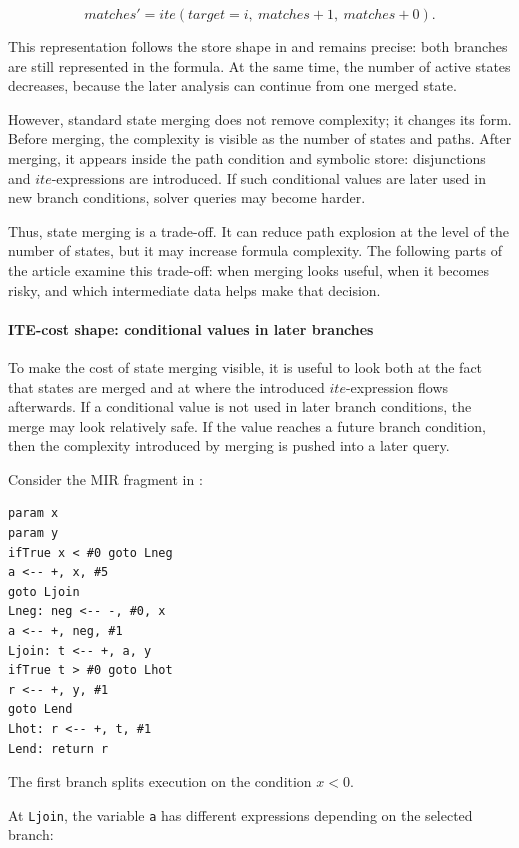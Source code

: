 \documentclass[conference]{IEEEtran}
\newcommand{\ite}{\mathit{ite}}
\begin{document}
\[
\mathit{matches}' =
\ite(\mathit{target} = i,\ \mathit{matches} + 1,\ \mathit{matches} + 0).
\]

This representation follows the store shape in  and
remains precise: both branches are still represented in the formula. At the
same time, the number of active states decreases, because the later analysis
can continue from one merged state.

However, standard state merging does not remove complexity; it changes its
form. Before merging, the complexity is visible as the number of states and
paths. After merging, it appears inside the path condition and symbolic store:
disjunctions and \(\ite\)-expressions are introduced. If such conditional values
are later used in new branch conditions, solver queries may become harder.

Thus, state merging is a trade-off. It can reduce path explosion at the level of
the number of states, but it may increase formula complexity. The following
parts of the article examine this trade-off: when merging looks useful, when it
becomes risky, and which intermediate data helps make that decision.

\paragraph{ITE-cost shape: conditional values in later branches}
To make the cost of state merging visible, it is useful to look both at the
fact that states are merged and at where the introduced \(\ite\)-expression
flows afterwards. If a conditional value is not used in later branch
conditions, the merge may look relatively safe. If the value reaches a future
branch condition, then the complexity introduced by merging is pushed into a
later query.

Consider the MIR fragment in :

\begin{lstlisting}[style=mirfull,caption={MIR branch with a join and a later hot branch.},label={lst:mir-ite-preview}]
param x
param y
ifTrue x < #0 goto Lneg
a <-- +, x, #5
goto Ljoin
Lneg: neg <-- -, #0, x
a <-- +, neg, #1
Ljoin: t <-- +, a, y
ifTrue t > #0 goto Lhot
r <-- +, y, #1
goto Lend
Lhot: r <-- +, t, #1
Lend: return r
\end{lstlisting}

The first branch splits execution on the condition \(x < 0\).

At \texttt{Ljoin}, the variable \texttt{a} has different expressions depending
on the selected branch:
\end{document}
